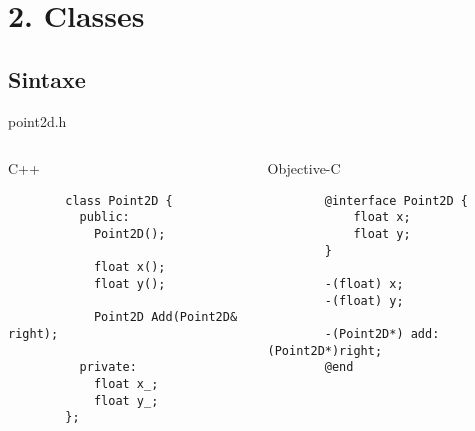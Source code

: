 \documentclass[brazil]{beamer}
\begin{document}
\section{2. Classes}

\subsection{Sintaxe}

\begin{frame}[fragile]
  point2d.h
  \begin{columns}
    \begin{column}{.5\textwidth}
      \begin{center}
        C++
      \end{center}
      \lstset{language=C++,basicstyle=\tiny}
      \begin{lstlisting}
        class Point2D {
          public:
            Point2D();

            float x();
            float y();

            Point2D Add(Point2D& right);

          private:
            float x_;
            float y_;
        };
      \end{lstlisting}
    \end{column}
    \begin{column}{.5\textwidth}
      \begin{center}
        Objective-C
      \end{center}
      \lstset{language=C++,basicstyle=\tiny}
      \begin{lstlisting}
        @interface Point2D {
            float x;
            float y;
        }

        -(float) x;
        -(float) y;
        
        -(Point2D*) add: (Point2D*)right;
        @end
      \end{lstlisting}
    \end{column}
  \end{columns}
\end{frame}
\end{document}
